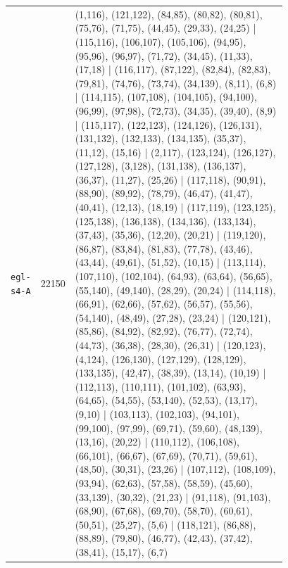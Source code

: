 \begin{landscape}
\begin{longtable}{lr>{\tiny\raggedright\arraybackslash}p{0.78\linewidth}}
\texttt{egl-s4-A} & 22150 & (1,116), (121,122), (84,85), (80,82), (80,81), (75,76), (71,75), (44,45), (29,33), (24,25) | (115,116), (106,107), (105,106), (94,95), (95,96), (96,97), (71,72), (34,45), (11,33), (17,18) | (116,117), (87,122), (82,84), (82,83), (79,81), (74,76), (73,74), (34,139), (8,11), (6,8) | (114,115), (107,108), (104,105), (94,100), (96,99), (97,98), (72,73), (34,35), (39,40), (8,9) | (115,117), (122,123), (124,126), (126,131), (131,132), (132,133), (134,135), (35,37), (11,12), (15,16) | (2,117), (123,124), (126,127), (127,128), (3,128), (131,138), (136,137), (36,37), (11,27), (25,26) | (117,118), (90,91), (88,90), (89,92), (78,79), (46,47), (41,47), (40,41), (12,13), (18,19) | (117,119), (123,125), (125,138), (136,138), (134,136), (133,134), (37,43), (35,36), (12,20), (20,21) | (119,120), (86,87), (83,84), (81,83), (77,78), (43,46), (43,44), (49,61), (51,52), (10,15) | (113,114), (107,110), (102,104), (64,93), (63,64), (56,65), (55,140), (49,140), (28,29), (20,24) | (114,118), (66,91), (62,66), (57,62), (56,57), (55,56), (54,140), (48,49), (27,28), (23,24) | (120,121), (85,86), (84,92), (82,92), (76,77), (72,74), (44,73), (36,38), (28,30), (26,31) | (120,123), (4,124), (126,130), (127,129), (128,129), (133,135), (42,47), (38,39), (13,14), (10,19) | (112,113), (110,111), (101,102), (63,93), (64,65), (54,55), (53,140), (52,53), (13,17), (9,10) | (103,113), (102,103), (94,101), (99,100), (97,99), (69,71), (59,60), (48,139), (13,16), (20,22) | (110,112), (106,108), (66,101), (66,67), (67,69), (70,71), (59,61), (48,50), (30,31), (23,26) | (107,112), (108,109), (93,94), (62,63), (57,58), (58,59), (45,60), (33,139), (30,32), (21,23) | (91,118), (91,103), (68,90), (67,68), (69,70), (58,70), (60,61), (50,51), (25,27), (5,6) | (118,121), (86,88), (88,89), (79,80), (46,77), (42,43), (37,42), (38,41), (15,17), (6,7) \\[2pt]

\end{longtable}
\end{landscape}
